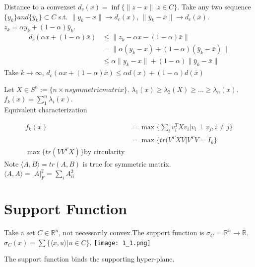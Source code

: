 \documentclass[11pt,fleqn]{book} %
\def\R{\mathbb{R}}
\newcommand{\cvx}{convex}
\begin{document}
\begin{CJK}{UTF8}{gkai}
\begin{example}[Distance]
Distance to a \cvx  set $d_c(x) = \inf \{ \| z-x \| | z \in C \}$. Take any two sequence $\{ y_k\} and \{ \bar{y}_k\} \subset C$ s.t. $\| y_k - x\| \to d_c(x)$, $\| \bar{y}_k - \bar{x}\| \to d_c(\bar{x})$. $z_k = \alpha y_k + (1 - \alpha) \bar{y}_k$.
\begin{align*}
d_c(\alpha x + (1-\alpha) \bar{x}) &\le \| z_k - \alpha x - (1 - \alpha) \bar{x}\| \\
& = \| \alpha(y_k - x) + (1 - \alpha)(\bar{y}_k - \bar{x})\| \\
& \le \alpha \| y_k - x\| + (1 - \alpha ) \|\bar{y}_k - \bar{x}\|
\end{align*}
Take $k \to \infty$, $d_c(\alpha x + (1 - \alpha) \bar{x}) \le \alpha d(x) + (1 - \alpha) d(\bar{x})$
\end{example}
\begin{example}[Eigenvalues]
Let $X \in S^n := \{ n \times n symmetric matrix\}$. $\lambda_1(x) \ge \lambda_2(X) \ge \ldots \ge \lambda_n(x)$.\\
$f_k(x) = \sum_{1}^n \lambda_i(x)$.\\
Equivalent characterization 

\begin{align*}
f_k(x) & = \max\{ \sum_{i} v_i^T Xv_i | v_i \perp v_j , i \neq j\} \\
& =  \max\{ tr( V^TXV | V^T V = I_k \} \\
\max \{tr(VV^TX) \} \text{by circularity}
\end{align*}
Note $\langle A,B\rangle  = tr(A,B)$ is true for symmetric matrix. \\
$\langle A,A\rangle  = |A |_F^2 = \sum_{i} A_{ii}^2$
\end{example}

\section{Support Function}
Take a set $C \in \R^n$, not necessarily convex.The support function is $\sigma_C = \R^n \to \bar{\R}$. $\sigma_C(x) = \sum \{ \langle x,u\rangle  | u \in C\}$.
\texttt{[image: 1\_1.png]}
\begin{fact}
The support function binds the supporting hyper-plane.
\end{fact}


\end{CJK}
\end{document}
